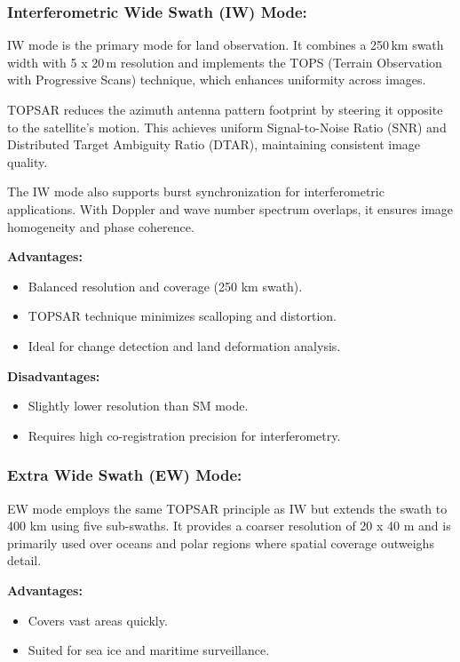 \subsubsection{\textbf{Interferometric Wide Swath (IW) Mode:}}

IW mode is the primary mode for land observation. It combines a 250 km swath width with 5 x 20 m resolution and implements the TOPS (Terrain Observation with Progressive Scans) technique, which enhances uniformity across images.

TOPSAR reduces the azimuth antenna pattern footprint by steering it opposite to the satellite’s motion. This achieves uniform Signal-to-Noise Ratio (SNR) and Distributed Target Ambiguity Ratio (DTAR), maintaining consistent image quality.

The IW mode also supports burst synchronization for interferometric applications. With Doppler and wave number spectrum overlaps, it ensures image homogeneity and phase coherence.


\textbf{Advantages:}
\begin{itemize}
    \item Balanced resolution and coverage (250 km swath).
    \item TOPSAR technique minimizes scalloping and distortion.
    \item Ideal for change detection and land deformation analysis.
\end{itemize}

\textbf{Disadvantages:}
\begin{itemize}
    \item Slightly lower resolution than SM mode.
    \item Requires high co-registration precision for interferometry.
\end{itemize}

\subsubsection{\textbf{Extra Wide Swath (EW) Mode:} }

EW mode employs the same TOPSAR principle as IW but extends the swath to 400 km using five sub-swaths. It provides a coarser resolution of 20 x 40 m and is primarily used over oceans and polar regions where spatial coverage outweighs detail.


\textbf{Advantages:}
\begin{itemize}
    \item Covers vast areas quickly.
    \item Suited for sea ice and maritime surveillance.
\end{itemize}

